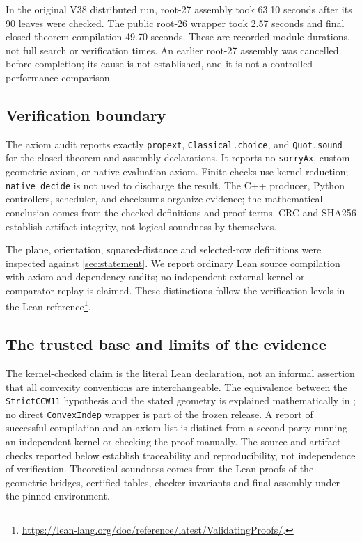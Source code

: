 \documentclass[11pt,a4paper]{article}
\theoremstyle{definition}
\newcommand{\code}[1]{\texttt{#1}}
\begin{document}
In the original V38 distributed run, root-27 assembly took 63.10 seconds after its 90 leaves were checked. The public root-26 wrapper took 2.57 seconds and final closed-theorem compilation 49.70 seconds. These are recorded module durations, not full search or verification times. An earlier root-27 assembly was cancelled before completion; its cause is not established, and it is not a controlled performance comparison.

\subsection{Verification boundary}
The axiom audit reports exactly \code{propext}, \code{Classical.choice}, and \code{Quot.sound} for the closed theorem and assembly declarations. It reports no \code{sorryAx}, custom geometric axiom, or native-evaluation axiom. Finite checks use kernel reduction; \code{native\_decide} is not used to discharge the result. The C++ producer, Python controllers, scheduler, and checksums organize evidence; the mathematical conclusion comes from the checked definitions and proof terms. CRC and SHA256 establish artifact integrity, not logical soundness by themselves.

The plane, orientation, squared-distance and selected-row definitions were inspected against \cref{sec:statement}. We report ordinary Lean source compilation with axiom and dependency audits; no independent external-kernel or comparator replay is claimed. These distinctions follow the verification levels in the Lean reference\footnote{\raggedright \url{https://lean-lang.org/doc/reference/latest/ValidatingProofs/}.}.


\subsection{The trusted base and limits of the evidence}
The kernel-checked claim is the literal Lean declaration, not an
informal assertion that all convexity conventions are interchangeable.
The equivalence between the \code{StrictCCW11} hypothesis and the
stated geometry is explained mathematically in
; no direct \code{ConvexIndep} wrapper is part
of the frozen release. A report of successful compilation and an
axiom list is distinct from a second party running an independent
kernel or checking the proof manually. The source and artifact
checks reported below establish traceability and reproducibility,
not independence of verification. Theoretical soundness comes
from the Lean proofs of the geometric bridges, certified tables,
checker invariants and final assembly under the pinned environment.
\end{document}
